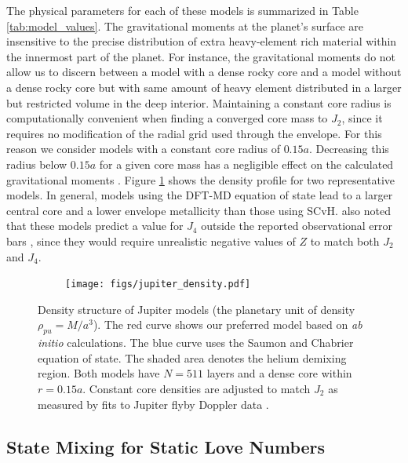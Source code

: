 The physical parameters for each of these models is summarized in Table
\ref{tab:model_values}. The gravitational moments at the planet's surface are
insensitive to the precise distribution of extra heavy-element rich material within the
innermost part of the planet. For instance, 
the gravitational moments do not allow us to discern between a model
with a dense rocky core and a model without a dense rocky core but with same amount
of heavy element distributed in a larger but restricted volume in the deep interior. 
Maintaining a constant core radius is
computationally convenient when finding a converged core mass to $J_{2}$, since it
requires no modification of the radial grid used through the envelope. For this
reason we consider models with a constant core radius of $0.15a$. Decreasing this
radius below $0.15a$ for a given core mass has a negligible effect on the calculated
gravitational moments \citep{hubbard2016}. Figure \ref{fig:density_structure} shows
the density profile for two representative models.  In general, models using the
DFT-MD equation of state lead to a larger central core and a lower envelope
metallicity than those using SCvH.  \citet{hubbard2016} also noted that these models
predict a value for $J_4$ outside the reported observational error bars
\citep{jacobson2003}, since they would require unrealistic negative values of $Z$ to
match both $J_2$ and $J_4$.

\begin{figure}[h!]  
  \centering
    \texttt{[image: figs/jupiter\_density.pdf]}
\caption{   Density structure of Jupiter models (the planetary unit of
density $\rho_{pu}=M/a^3$).  The red curve shows our preferred
    model based on \textit{ab initio} calculations. The blue curve uses the Saumon and
    Chabrier equation of state. The shaded area denotes the helium demixing region.
    Both models have $N=511$ layers and a dense core within $r=0.15a$.  Constant core
    densities are adjusted to match $J_2$ as measured by fits to Jupiter flyby Doppler
    data \citep{jacobson2003}.}
\label{fig:density_structure}
\end{figure}

\subsection{State Mixing for Static Love Numbers} \label{state_mixing}

